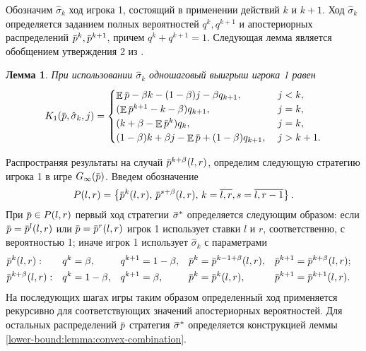 \documentclass[12pt, draft]{extarticle}
\newtheorem{lemma}{Лемма}
\newcommand{\overbar}[1]%
{\mkern 1.5mu\overline{\mkern-1.3mu#1\mkern-1.3mu}\mkern 1.3mu}
\newcommand{\p}{\ensuremath{\overbar{p}}}
\DeclareMathOperator{\E}{\mathbb{E}}
\newcommand{\G}[1][n]{\ensuremath{G_{#1}}}
\newcommand{\K}[1][n]{\ensuremath{K_{#1}}}
\newcommand{\sigmav}{\ensuremath{\overbar{\sigma}}}
\newcommand{\sigmak}{\ensuremath{\hat{\sigma}}}
\begin{document}
Обозначим $\sigmak_k$ ход игрока 1, состоящий в применении действий $k$ и $k+1$.
Ход $\sigmak_k$ определяется заданием полных вероятностей $q^k, q^{k+1}$ и
апостериорных распределений $\p^k, \p^{k+1}$, причем $q^k + q^{k+1} = 1$.
Следующая лемма является обобщением утверждения 2 из \cite{bib:pyanykh16}.
\begin{lemma}
  \label{lower-bound:lemma:stage-payoff}
  При использовании $\sigmak_k$ одношаговый выигрыш игрока 1 равен
  \begin{equation*}
    \K[1](\p, \sigmak_k, j) = \begin{cases}
      \E \p - \beta k - (1-\beta) j - \beta q_{k+1}, &\; j < k, \\
      (\E \p^{k+1} - k - \beta) q_{k+1}, &\; j = k, \\
      (k + \beta - \E \p^k) q_k, &\; j = k, \\
      (1-\beta) k + \beta j - \E \p + (1-\beta) q_{k+1}, &\; j > k + 1.
    \end{cases}
  \end{equation*}
\end{lemma}

Распространяя результаты \cite{bib:pyanykh16} на случай $\p^{k+\beta}(l, r)$,
определим следующую стратегию игрока 1 в игре $\G[\infty](\p)$. Введем
обозначение %
\begin{equation*}
  P(l,r) = \left\{
    \p^k(l, r), \, \p^{s+\beta}(l, r), \, k = \overline{l,r}, s = \overline{l,r-1}
  \right\}.
\end{equation*}
При $\p \in P(l,r)$ первый ход стратегии $\sigmav^*$ определяется следующим
образом: если $\p = \p^l(l,r)$ или $\p = \p^r(l,r)$ игрок 1 использует ставки
$l$ и $r$, соответственно, с вероятностью 1; иначе игрок 1 использует
$\sigmak_k$ с параметрами
\begin{align*}
  &\p^k(l, r):&
  &q^k = \beta,&
  &q^{k+1} = 1-\beta,&
  &\p^k = \p^{k-1+\beta}(l, r),&
  &\p^{k+1} = \p^{k+\beta}(l, r);&\\
  &\p^{k+\beta}(l, r):&
  &q^k = 1-\beta,&
  &q^{k+1} = \beta,&
  &\p^k = \p^k(l, r),&
  &\p^{k+1} = \p^{k+1}(l, r).&
\end{align*}
На последующих шагах игры таким образом определенный ход применяется
рекурсивно для соответствующих значений апостериорных вероятностей. Для
остальных распределений $\p$ стратегия $\sigmav^*$ определяется конструкцией
леммы \ref{lower-bound:lemma:convex-combination}.
\end{document}
